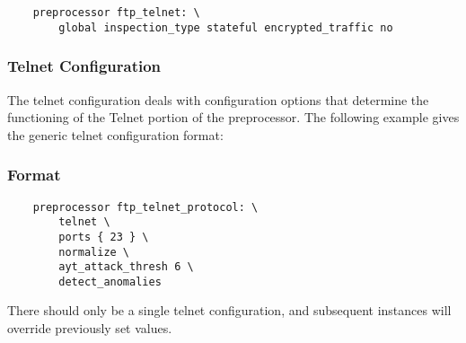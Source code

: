 \documentclass[english]{report}
\begin{document}
\begin{verbatim}
    preprocessor ftp_telnet: \
        global inspection_type stateful encrypted_traffic no
\end{verbatim}

\subsubsection{Telnet Configuration}

The telnet configuration deals with configuration options that determine the
functioning of the Telnet portion of the preprocessor.  The following example
gives the generic telnet configuration format:

\subsubsection{Format}
\begin{verbatim}
    preprocessor ftp_telnet_protocol: \
        telnet \
        ports { 23 } \
        normalize \
        ayt_attack_thresh 6 \
        detect_anomalies

\end{verbatim}

There should  only be a single telnet configuration, and subsequent instances
will override previously set values.
\end{document}
